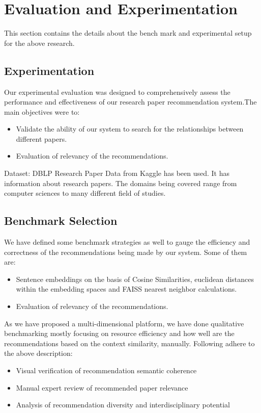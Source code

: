 \documentclass[runningheads]{llncs}
\begin{document}
\section{\textbf{Evaluation and Experimentation}}
This section contains the details about the bench mark and experimental setup for the above research.
\subsection{\textbf{Experimentation}}
Our experimental evaluation was designed to comprehensively assess the performance and effectiveness of our research paper recommendation system.The main objectives were to:
\begin{itemize}
    \item Validate the ability of our system to search for the relationships between different papers.
    \item Evaluation of relevancy of the recommendations.
\end{itemize}
Dataset: 
DBLP Research Paper Data from Kaggle has been used. It has information about research papers. The domains being covered range from computer sciences to many different field of studies.

\subsection{\textbf{Benchmark Selection}}
We have defined some benchmark strategies as well to gauge the efficiency and correctness of the recommendations being made by our system. Some of them are:
\begin{itemize}
    \item Sentence embeddings on the basis of Cosine Similarities, euclidean distances within the embedding spaces and FAISS nearest neighbor calculations.
    \item Evaluation of relevancy of the recommendations.
\end{itemize}
As we have proposed a multi-dimensional platform, we have done qualitative benchmarking mostly focusing on resource efficiency and how well are the recommendations based on the context similarity, manually. Following adhere to the above description:
\begin{itemize}
\item Visual verification of recommendation semantic coherence
\item Manual expert review of recommended paper relevance
\item Analysis of recommendation diversity and interdisciplinary potential
\end{itemize}
\end{document}
